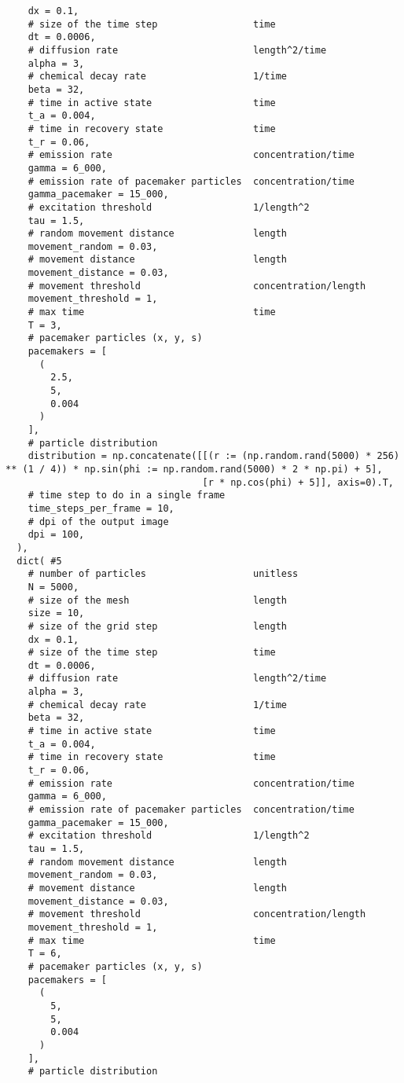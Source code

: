 \begin{verbatim}
    dx = 0.1,
    # size of the time step                 time
    dt = 0.0006,
    # diffusion rate                        length^2/time
    alpha = 3,
    # chemical decay rate                   1/time
    beta = 32,
    # time in active state                  time
    t_a = 0.004,
    # time in recovery state                time
    t_r = 0.06,
    # emission rate                         concentration/time
    gamma = 6_000,
    # emission rate of pacemaker particles  concentration/time
    gamma_pacemaker = 15_000,
    # excitation threshold                  1/length^2
    tau = 1.5,
    # random movement distance              length
    movement_random = 0.03,
    # movement distance                     length
    movement_distance = 0.03,
    # movement threshold                    concentration/length
    movement_threshold = 1,
    # max time                              time
    T = 3,
    # pacemaker particles (x, y, s)
    pacemakers = [
      (
        2.5,
        5,
        0.004
      )
    ],
    # particle distribution
    distribution = np.concatenate([[(r := (np.random.rand(5000) * 256) ** (1 / 4)) * np.sin(phi := np.random.rand(5000) * 2 * np.pi) + 5],
                                   [r * np.cos(phi) + 5]], axis=0).T,
    # time step to do in a single frame
    time_steps_per_frame = 10,
    # dpi of the output image
    dpi = 100,
  ),
  dict( #5
    # number of particles                   unitless
    N = 5000,
    # size of the mesh                      length
    size = 10,
    # size of the grid step                 length
    dx = 0.1,
    # size of the time step                 time
    dt = 0.0006,
    # diffusion rate                        length^2/time
    alpha = 3,
    # chemical decay rate                   1/time
    beta = 32,
    # time in active state                  time
    t_a = 0.004,
    # time in recovery state                time
    t_r = 0.06,
    # emission rate                         concentration/time
    gamma = 6_000,
    # emission rate of pacemaker particles  concentration/time
    gamma_pacemaker = 15_000,
    # excitation threshold                  1/length^2
    tau = 1.5,
    # random movement distance              length
    movement_random = 0.03,
    # movement distance                     length
    movement_distance = 0.03,
    # movement threshold                    concentration/length
    movement_threshold = 1,
    # max time                              time
    T = 6,
    # pacemaker particles (x, y, s)
    pacemakers = [
      (
        5,
        5,
        0.004
      )
    ],
    # particle distribution

\end{verbatim}
